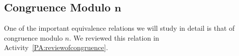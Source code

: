 \subsection*{Congruence Modulo $\boldsymbol{n}$}
One of the important equivalence relations we will study in detail is that of congruence
%
 modulo  $n$.  We reviewed this relation in \typeu Activity~\ref*{PA:reviewofcongruence}.


